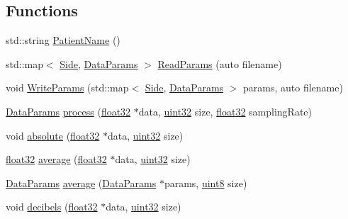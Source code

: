 \subsection*{Functions}
\begin{DoxyCompactItemize}
\item 
std\+::string \hyperlink{namespaceavda_ae20728e7e8ae50bf2f74849e538841ea}{Patient\+Name} ()
\item 
std\+::map$<$ \hyperlink{namespaceavda_af723e82f0d3d45fda6fdc01f6a492786}{Side}, \hyperlink{structDataParams}{Data\+Params} $>$ \hyperlink{namespaceavda_a46dc980b65ddfc24749ce25c1290e158}{Read\+Params} (auto filename)
\item 
void \hyperlink{namespaceavda_a1e3f5a0eb4ee9a7010d57dc38bd8dfec}{Write\+Params} (std\+::map$<$ \hyperlink{namespaceavda_af723e82f0d3d45fda6fdc01f6a492786}{Side}, \hyperlink{structDataParams}{Data\+Params} $>$ params, auto filename)
\item 
\hyperlink{structDataParams}{Data\+Params} \hyperlink{namespaceavda_a5196cce27286d08ca144a460caee7839}{process} (\hyperlink{definitions_8hpp_aacdc525d6f7bddb3ae95d5c311bd06a1}{float32} $\ast$data, \hyperlink{definitions_8hpp_a1134b580f8da4de94ca6b1de4d37975e}{uint32} size, \hyperlink{definitions_8hpp_aacdc525d6f7bddb3ae95d5c311bd06a1}{float32} sampling\+Rate)
\item 
void \hyperlink{namespaceavda_aa771d0ed99fc4954c643ea71e91905bf}{absolute} (\hyperlink{definitions_8hpp_aacdc525d6f7bddb3ae95d5c311bd06a1}{float32} $\ast$data, \hyperlink{definitions_8hpp_a1134b580f8da4de94ca6b1de4d37975e}{uint32} size)
\item 
\hyperlink{definitions_8hpp_aacdc525d6f7bddb3ae95d5c311bd06a1}{float32} \hyperlink{namespaceavda_a2a830f24a59aa2538ea82f6e000cce61}{average} (\hyperlink{definitions_8hpp_aacdc525d6f7bddb3ae95d5c311bd06a1}{float32} $\ast$data, \hyperlink{definitions_8hpp_a1134b580f8da4de94ca6b1de4d37975e}{uint32} size)
\item 
\hyperlink{structDataParams}{Data\+Params} \hyperlink{namespaceavda_a87927e04b25012fa7fa0fe05eefce41a}{average} (\hyperlink{structDataParams}{Data\+Params} $\ast$params, \hyperlink{definitions_8hpp_adde6aaee8457bee49c2a92621fe22b79}{uint8} size)
\item 
void \hyperlink{namespaceavda_a9c0b7f832eace3cbc9c5dddea2ecc9d5}{decibels} (\hyperlink{definitions_8hpp_aacdc525d6f7bddb3ae95d5c311bd06a1}{float32} $\ast$data, \hyperlink{definitions_8hpp_a1134b580f8da4de94ca6b1de4d37975e}{uint32} size)
\item 

\end{DoxyCompactItemize}
